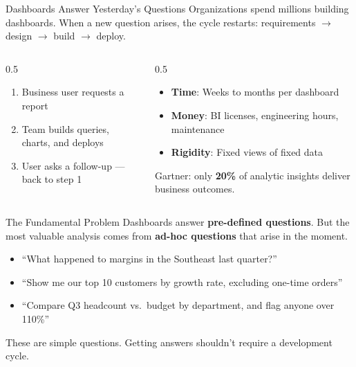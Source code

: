 \documentclass[aspectratio=169]{beamer}
\begin{document}
\begin{frame}{Dashboards Answer Yesterday's Questions}
Organizations spend millions building dashboards. When a new question arises, the cycle restarts: requirements $\rightarrow$ design $\rightarrow$ build $\rightarrow$ deploy.
\vspace{0.3cm}
\begin{columns}[T]
\begin{column}{0.5\textwidth}
\begin{shadedbox}[title=\textbf{The Typical Dashboard Lifecycle}]
\begin{enumerate}\small
  \item Business user requests a report
  \item Team builds queries, charts, and deploys
  \item User asks a follow-up --- \alert{back to step 1}
\end{enumerate}
\end{shadedbox}
\end{column}
\begin{column}{0.5\textwidth}
\begin{shadedbox}[title=\textbf{The Cost}]
\begin{itemize}\small
  \item \textbf{Time}: Weeks to months per dashboard
  \item \textbf{Money}: BI licenses, engineering hours, maintenance
  \item \textbf{Rigidity}: Fixed views of fixed data
\end{itemize}
\end{shadedbox}
\vspace{0.2cm}
Gartner: only \textbf{20\%} of analytic insights deliver business outcomes.
\end{column}
\end{columns}
\end{frame}

\begin{frame}{The Fundamental Problem}
Dashboards answer \textbf{pre-defined questions}. But the most valuable analysis comes from \textbf{ad-hoc questions} that arise in the moment.
\vspace{0.3cm}
\begin{itemize}
  \item ``What happened to margins in the Southeast last quarter?''
  \item ``Show me our top 10 customers by growth rate, excluding one-time orders''
  \item ``Compare Q3 headcount vs.\ budget by department, and flag anyone over 110\%''
\end{itemize}
\vspace{0.3cm}
These are simple questions. Getting answers shouldn't require a development cycle.
\end{frame}
\end{document}
